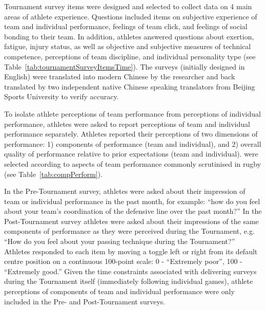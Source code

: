 \begin{CJK}{UTF8}{gbsn}
Tournament survey items were designed and selected to collect data on 4 main areas of athlete experience.  Questions included items on subjective experience of team and individual performance, feelings of team click, and feelings of social bonding to their team.  In addition, athletes answered questions about exertion, fatigue, injury status, as well as objective and subjective measures of technical competence, perceptions of team discipline, and individual personality type (see Table~\ref{tab:tournamentSurveyItemsTime}). The surveys (initially designed in English) were translated into modern Chinese by the researcher and back translated by two independent native Chinese speaking translators from Beijing Sports University to verify accuracy.






To isolate athlete perceptions of team performance from perceptions of individual performance, athletes were asked to report perceptions of team and individual performance separately.  Athletes reported their perceptions of two dimensions of performance: 1) components of performance (team and individual), and 2) overall quality of performance relative to prior expectations (team and individual).  were selected according to aspects of team performance commonly scrutinised in rugby (see Table~\ref{tab:compPerform}).




In the Pre-Tournament survey, athletes were asked about their impression of team or individual performance in the past month, for example: ``how do you feel about your team's coordination of the defensive line over the past month?''  In the Post-Tournament survey athletes were asked about their impressions of the same components of performance as they were perceived during the Tournament, e.g. ``How do you feel about your passing technique during the Tournament?'' Athletes responded to each item by moving a toggle left or right from its default centre position on a continuous 100-point scale: 0 - ``Extremely poor'', 100 - ``Extremely good.''  Given the time constraints associated with delivering surveys during the Tournament itself (immediately following individual games), athlete perceptions of components of team and individual performance were only included in the Pre- and Post-Tournament surveys.


\end{CJK}
